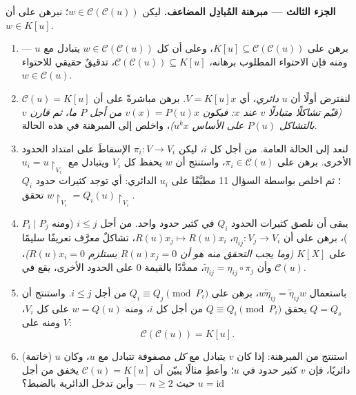 \begin{problem}
\medskip
\noindent\textbf{الجزء الثالث --- مبرهنة المُبادِل المضاعف.}
ليكن $w \in \mathcal C(\mathcal C(u))$؛ نبرهن على أن $w \in K[u]$.
\begin{enumerate}[resume]
  \item برهن على $K[u] \subseteq \mathcal C(\mathcal C(u))$، وعلى أن كل $w \in \mathcal C(\mathcal C(u))$ يتبادل مع $u$ ---
        ومنه فإن الاحتواء المطلوب برهانه، $\mathcal C(\mathcal C(u)) \subseteq K[u]$، تدقيقٌ حقيقي
        للاحتواء $w \in \mathcal C(u)$.
  \item لنفترض أولًا أن $u$ \emph{دائري}، أي $V = K[u]x$. برهن
        مباشرةً على أن $\mathcal C(u) = K[u]$ \emph{(قيّم تشاكلًا متبادلًا $v$
        عند $x$: فيكون $v(x) = P(u)x$ من أجل $P$ ما، ثم قارن $v$
        بالتشاكل $P(u)$ على الأساس $u^k x$)}، واخلص إلى المبرهنة في هذه
        الحالة.
  \item لنعد إلى الحالة العامة. من أجل كل $i$، ليكن $\pi_i\colon
        V \to V_i$
        الإسقاطَ على امتداد الحدود الأخرى. برهن على $\pi_i \in \mathcal C(u)$،
        واستنتج أن $w$ يحفظ كل $V_i$ ويتبادل مع $u_i =
        u\restriction_{V_i}$؛ ثم اخلص
        بواسطة السؤال 11 مطبَّقًا على $u_i$ الدائري: أي توجد
        كثيرات حدود $Q_i$ تحقق $w\restriction_{V_i} = Q_i(u)\restriction_{V_i}$.
  \item يبقى أن نلصق كثيرات الحدود $Q_i$ في كثير حدود واحد. من
        أجل $i
        \leq j$ (ومنه $P_i \mid P_j$)، برهن على أن $\eta_{ij} \colon
        V_j \to V_i$،
        $R(u)x_j \mapsto R(u)x_i$، تشاكلٌ معرَّف تعريفًا سليمًا على $K[X]$
        \emph{(وما يجب التحقق منه هو أن $R(u)x_j = 0$ يستلزم
        $R(u)x_i = 0$)}، وأن $\tilde\eta_{ij} = \eta_{ij}\circ\pi_j$، ممدَّدًا بالقيمة $0$ على الحدود
        الأخرى، يقع في $\mathcal C(u)$.
  \item باستعمال $w\tilde\eta_{ij} = \tilde\eta_{ij}w$، برهن على $Q_i
        \equiv Q_j \pmod{P_i}$ من أجل $i \leq j$.
        واستنتج أن $Q =
        Q_s$ يحقق $Q \equiv Q_i \pmod {P_i}$ من أجل كل $i$، ومنه
        $w = Q(u)$ على كل $V_i$، ومنه على $V$:
        \[
        \boxed{\ \mathcal C(\mathcal C(u)) = K[u].\ }
        \]
  \item (خاتمة) استنتج من المبرهنة: إذا كان $v$ يتبادل مع
        \emph{كل} مصفوفة تتبادل مع $u$، وكان $u$ دائريًا، فإن $v$
        كثير حدود في $u$؛ وأعطِ مثالًا يبيّن أن $\mathcal C(u) = K[u]$ يخفق من
        أجل $u =
        \mathrm{id}$ حيث $n \geq 2$ --- وأين تدخل الدائرية
        بالضبط؟
\end{enumerate}


\end{problem}
